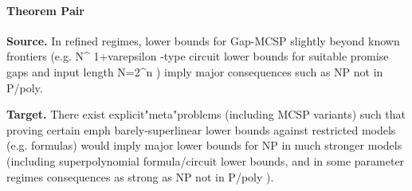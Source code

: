 \documentclass[11pt]{article}
\begin{document}
\paragraph{Theorem Pair}
\textbf{Source.} In refined regimes, lower bounds for Gap-MCSP slightly beyond known frontiers (e.g. N\textasciicircum{} 1+varepsilon -type circuit lower bounds for suitable promise gaps and input length N=2\textasciicircum{}n ) imply major consequences such as NP not in P/poly.

\textbf{Target.} There exist explicit"meta"problems (including MCSP variants) such that proving certain emph barely-superlinear lower bounds against restricted models (e.g. formulas) would imply major lower bounds for NP in much stronger models (including superpolynomial formula/circuit lower bounds, and in some parameter regimes consequences as strong as NP not in P/poly ).
\end{document}
